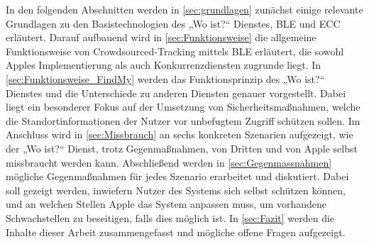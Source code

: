 In den folgenden Abschnitten werden in \autoref{sec:grundlagen} zunächst einige relevante Grundlagen zu den Basistechnologien des „Wo ist?“ Dienstes, \ac{BLE} und \ac{ECC} erläutert.
Darauf aufbauend wird in \autoref{sec:Funktionsweise} die allgemeine Funktionsweise von Crowdsourced-Tracking mittels \ac{BLE} erläutert, die sowohl Apples Implementierung als auch Konkurrenzdiensten zugrunde liegt.
In \autoref{sec:Funktionsweise_FindMy} werden das Funktionsprinzip des „Wo ist?“ Dienstes und die Unterschiede zu anderen Diensten genauer vorgestellt.
Dabei liegt ein besonderer Fokus auf der Umsetzung von Sicherheitsmaßnahmen, welche die Standortinformationen der Nutzer vor unbefugtem Zugriff schützen sollen.
Im Anschluss wird in \autoref{sec:Missbrauch} an sechs konkreten Szenarien aufgezeigt, wie der „Wo ist?“ Dienst, trotz Gegenmaßnahmen, von Dritten und von Apple selbst missbraucht werden kann.
Abschließend werden in \autoref{sec:Gegenmassnahmen} mögliche Gegenmaßnahmen für jedes Szenario erarbeitet und diskutiert.
Dabei soll gezeigt werden, inwiefern Nutzer des Systems sich selbst schützen können, und an welchen Stellen Apple das System anpassen muss, um vorhandene Schwachstellen zu beseitigen, falls dies möglich ist.
In \autoref{sec:Fazit} werden die Inhalte dieser Arbeit zusammengefasst und mögliche offene Fragen aufgezeigt. %